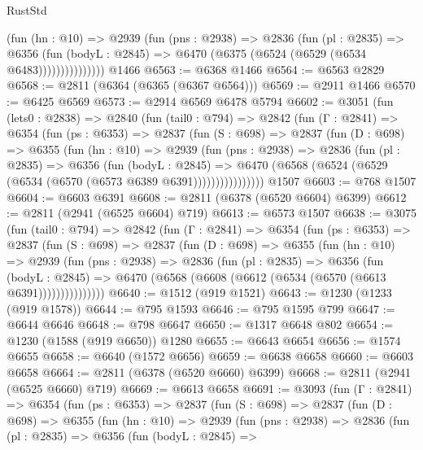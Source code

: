 \begin{lexlean}{RustStd}
\begin{coremodule}
                  (fun (hn : @10) =>
                  @2939
                    (fun (pns : @2938) =>
                    @2836
                      (fun (pl : @2835) =>
                      @6356
                        (fun (bodyL : @2845) =>
                        @6470 (@6375 (@6524 (@6529 (@6534 @6483)))))))))))))))
    @1466
@6563 := @6368 @1466
@6564 := @6563 @2829
@6568 := @2811 (@6364 (@6365 (@6367 @6564)))
@6569 := @2911 @1466
@6570 := @6425 @6569
@6573 := @2914 @6569 @6478 @5794
@6602 := @3051
    (fun (lets0 : @2838) =>
    @2840
      (fun (tail0 : @794) =>
      @2842
        (fun (Γ : @2841) =>
        @6354
          (fun (ps : @6353) =>
          @2837
            (fun (S : @698) =>
            @2837
              (fun (D : @698) =>
              @6355
                (fun (hn : @10) =>
                @2939
                  (fun (pns : @2938) =>
                  @2836
                    (fun (pl : @2835) =>
                    @6356
                      (fun (bodyL : @2845) =>
                      @6470 (@6568 (@6524 (@6529 (@6534 (@6570 (@6573 @6389 @6391))))))))))))))))
    @1507
@6603 := @768 @1507
@6604 := @6603 @6391
@6608 := @2811 (@6378 (@6520 @6604) @6399)
@6612 := @2811 (@2941 (@6525 @6604) @719)
@6613 := @6573 @1507
@6638 := @3075
    (fun (tail0 : @794) =>
    @2842
      (fun (Γ : @2841) =>
      @6354
        (fun (ps : @6353) =>
        @2837
          (fun (S : @698) =>
          @2837
            (fun (D : @698) =>
            @6355
              (fun (hn : @10) =>
              @2939
                (fun (pns : @2938) =>
                @2836
                  (fun (pl : @2835) =>
                  @6356
                    (fun (bodyL : @2845) =>
                    @6470 (@6568 (@6608 (@6612 (@6534 (@6570 (@6613 @6391)))))))))))))))
@6640 := @1512 (@919 @1521)
@6643 := @1230 (@1233 (@919 @1578))
@6644 := @795 @1593
@6646 := @795 @1595 @799
@6647 := @6644 @6646
@6648 := @798 @6647
@6650 := @1317 @6648 @802
@6654 := @1230 (@1588 (@919 @6650)) @1280
@6655 := @6643 @6654
@6656 := @1574 @6655
@6658 := @6640 (@1572 @6656)
@6659 := @6638 @6658
@6660 := @6603 @6658
@6664 := @2811 (@6378 (@6520 @6660) @6399)
@6668 := @2811 (@2941 (@6525 @6660) @719)
@6669 := @6613 @6658
@6691 := @3093
    (fun (Γ : @2841) =>
    @6354
      (fun (ps : @6353) =>
      @2837
        (fun (S : @698) =>
        @2837
          (fun (D : @698) =>
          @6355
            (fun (hn : @10) =>
            @2939
              (fun (pns : @2938) =>
              @2836
                (fun (pl : @2835) =>
                @6356
                  (fun (bodyL : @2845) =>

\end{coremodule}
\end{lexlean}
